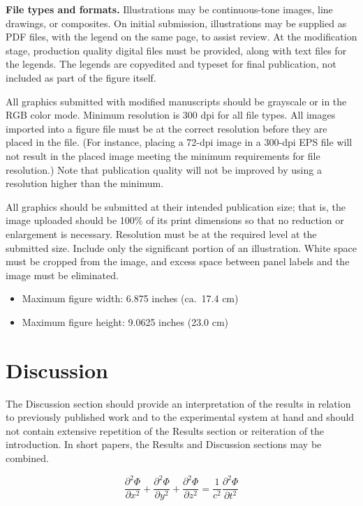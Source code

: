 \documentclass[lineno]{asm-article}
\begin{document}
\textbf{File types and formats.}
Illustrations may be continuous-tone images, line drawings, or composites. On initial submission, illustrations may be supplied as PDF files, with the legend on the same page, to assist review. At the modification stage, production quality digital files must be provided, along with text files for the legends. The legends are copyedited and typeset for final publication, not included as part of the figure itself.

All graphics submitted with modified manuscripts should be grayscale or in the RGB color mode. Minimum resolution is 300 dpi for all file types. All images imported into a figure file must be at the correct resolution before they are placed in the file. (For instance, placing a 72-dpi image in a 300-dpi EPS file will not result in the placed image meeting the minimum requirements for file resolution.) Note that publication quality will not be improved by using a resolution higher than the minimum.

All graphics should be submitted at their intended publication size; that is, the image uploaded should be 100\% of its print dimensions so that no reduction or enlargement is necessary. Resolution must be at the required level at the submitted size. Include only the significant portion of an illustration. White space must be cropped from the image, and excess space between panel labels and the image must be eliminated.

\begin{itemize}
\item Maximum figure width: 6.875 inches (ca.~17.4 cm)
\item Maximum figure height: 9.0625 inches (23.0 cm)
\end{itemize}


\section{Discussion}
The Discussion section should provide an interpretation of the results in relation to previously published work and to the experimental system at hand and should not contain extensive repetition of the Results section or reiteration of the introduction. In short papers, the Results and Discussion sections may be combined.

\begin{equation}
\frac{\partial^2 \Phi}{\partial x^2} + \frac{\partial^2 \Phi}{\partial y^2} +
            \frac{\partial^2 \Phi}{\partial z^2} =
            \frac{1}{c^2}\frac{\partial^2\Phi}{\partial t^2}
\end{equation}
\end{document}

